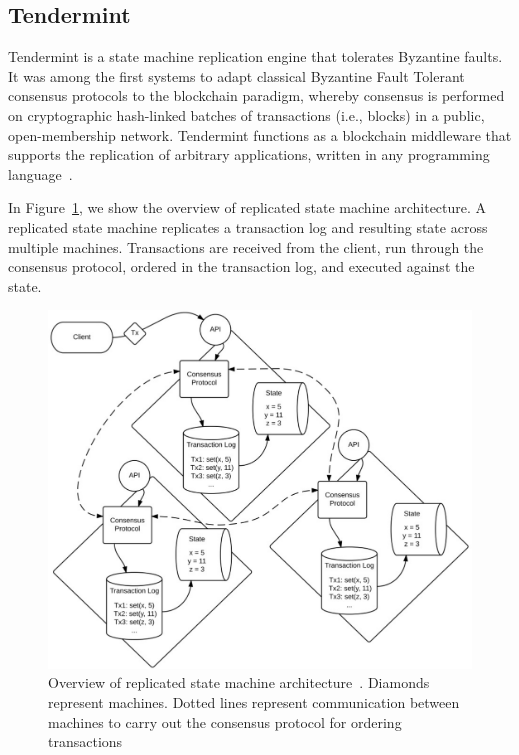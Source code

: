 \subsection{Tendermint}\label{sec:tendermint}
%
Tendermint is a state machine replication engine that tolerates Byzantine faults.
%
It was among the first systems to adapt classical Byzantine Fault Tolerant consensus protocols
to the blockchain paradigm, whereby consensus is performed on cryptographic hash-linked batches of
transactions (i.e., blocks) in a public, open-membership network.
%
Tendermint functions as a blockchain middleware that supports the replication of arbitrary
applications, written in any programming language~\cite{tendermint.design}.

In Figure~\ref{fig:replication}, we show the overview of replicated state machine architecture.
%
A replicated state machine replicates a transaction log and resulting state across multiple machines.
%
Transactions are received from the client, run through the consensus protocol, ordered in the
transaction log, and executed against the state.
%
%

\begin{figure}
  \centering
  \includegraphics[scale=0.25]{figures/replication_engine.pdf}
  \caption{Overview of replicated state machine architecture~\cite{Buchman.2018.Tendermint}.
    Diamonds represent machines.
    Dotted lines represent communication between machines to carry out the
consensus protocol for ordering transactions
  }
  \label{fig:replication}
\end{figure}

